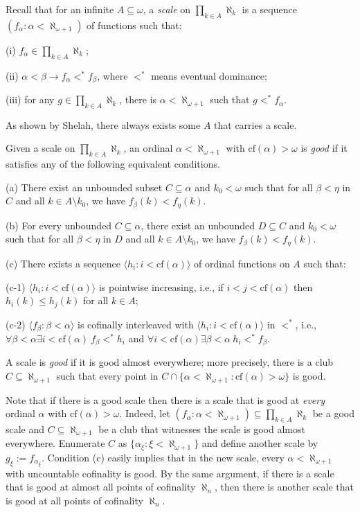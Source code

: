 \documentclass[10pt,reqno]{amsart}
\theoremstyle{plain}
\theoremstyle{definition}
\theoremstyle{remark}
\begin{document}
Recall that for an infinite $A\subseteq\omega$, a \textit{scale} on $\prod_{k\in A} \aleph_k$ is a sequence $(f_\alpha:\alpha<\aleph_{\omega+1})$ of functions such that:

(i) $f_\alpha\in\prod_{k\in A} \aleph_k$;

(ii) $\alpha<\beta\rightarrow f_\alpha<^* f_\beta$, where $<^*$ means eventual dominance;

(iii) for any $g\in\prod_{k\in A} \aleph_k$, there is $\alpha<\aleph_{\omega+1}$ such that $g<^* f_\alpha$.

As shown by Shelah, there always exists some $A$ that carries a scale.

Given a scale on $\prod_{k\in A} \aleph_k$, an ordinal $\alpha<\aleph_{\omega+1}$ with $\mathrm{cf}(\alpha)>\omega$ is \textit{good} if it satisfies any of the following equivalent conditions.

(a) There exist an unbounded subset $C\subseteq\alpha$ and $k_0<\omega$ such that for all $\beta<\eta$ in $C$ and all $k\in A\setminus k_0$, we have $f_\beta(k)<f_\eta(k)$.

(b) For every unbounded $C\subseteq\alpha$, there exist an unbounded $D\subseteq C$ and $k_0<\omega$ such that for all $\beta<\eta$ in $D$ and all $k\in A\setminus k_0$, we have $f_\beta(k)<f_\eta(k)$.

(c) There exists a sequence $\langle h_i:i<\mathrm{cf}(\alpha)\rangle$ of ordinal functions on $A$ such that: 
	
(c-1) $\langle h_i:i<\mathrm{cf}(\alpha)\rangle$ is pointwise increasing, i.e., if $i<j<\mathrm{cf}(\alpha)$ then $h_i(k)\leq h_j(k)$ for all $k\in A$;
	
(c-2) $\langle f_\beta:\beta<\alpha\rangle$ is cofinally interleaved with $\langle h_i:i<\mathrm{cf}(\alpha)\rangle$ in $<^*$, i.e., $\forall\beta<\alpha\exists i<\mathrm{cf}(\alpha)\ f_\beta<^* h_i$ and $\forall i<\mathrm{cf}(\alpha)\exists\beta<\alpha \ h_i<^* f_\beta$.

A scale is \textit{good} if it is good almost everywhere; more precisely, there is a club $C\subseteq\aleph_{\omega+1}$ such that every point in $C\cap\{\alpha<\aleph_{\omega+1}:\mathrm{cf}(\alpha)>\omega\}$ is good.

Note that if there is a good scale then there is a scale that is good at \textit{every} ordinal $\alpha$ with $\mathrm{cf}(\alpha)>\omega$. Indeed, let $(f_\alpha:\alpha<\aleph_{\omega+1})\subseteq\prod_{k\in A}\aleph_k$ be a good scale and $C\subseteq\aleph_{\omega+1}$ be a club that witnesses the scale is good almost everywhere. Enumerate $C$ as $\{\alpha_\xi:\xi<\aleph_{\omega+1}\}$ and define another scale by $g_\xi:=f_{\alpha_\xi}$. Condition (c) easily implies that in the new scale, every $\alpha<\aleph_{\omega+1}$ with uncountable cofinality is good. By the same argument, if there is a scale that is good at almost all points of cofinality $\aleph_n$, then there is another scale that is good at all points of cofinality $\aleph_n$.
\end{document}
